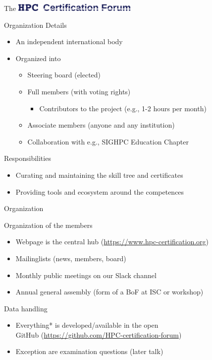 \documentclass[compress,aspectratio=169]{beamer}
\begin{document}
\begin{frame}{The \includegraphics[width=0.45\textwidth]{hpccf-full}}

	\begin{block}{Organization Details}
		\begin{itemize}
			\item An independent international body
			\item Organized into
				\begin{itemize}
					\item Steering board (elected)
					\item Full members (with voting rights)
            \begin{itemize}
              \item Contributors to the project (e.g., 1-2 hours per month)
            \end{itemize}
					\item Associate members (anyone and any institution)
          \item Collaboration with e.g., SIGHPC Education Chapter
				\end{itemize}
		\end{itemize}
	\end{block}

	\begin{block}{Responsibilities}
		\begin{itemize}
			\item Curating and maintaining the skill tree and certificates
			\item Providing tools and ecosystem around the competences
		\end{itemize}
	\end{block}
\end{frame}


\begin{frame}{Organization}
  \begin{block}{Organization of the members}
	\begin{itemize}
  \item Webpage is the central hub (\url{https://www.hpc-certification.org})
  \item Mailinglists (news, members, board)
	\item Monthly public meetings on our Slack channel
  \item Annual general assembly (form of a BoF at ISC or workshop)
  \end{itemize}
  \end{block}

  \begin{block}{Data handling}
    \begin{itemize}
      \item Everything* is developed/available in the open \\
        GitHub (\url{https://github.com/HPC-certification-forum})
      \item Exception are examination questions (later talk)
    \end{itemize}
  \end{block}
\end{frame}
\end{document}
